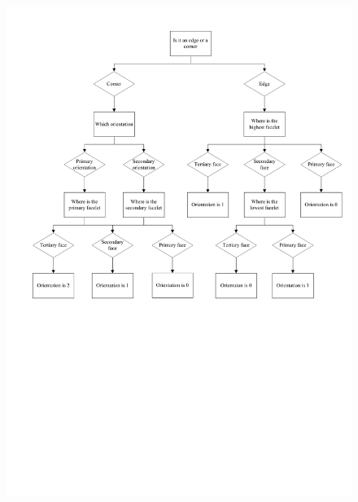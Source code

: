 \begin{figure}[hbp]
	\centering
		\includegraphics[width = \textwidth, trim = 10mm 120mm 0mm 10mm, clip]{input/pics/orientationFlow}
	\caption{}
	\label{fig:orientationFlow}
\end{figure}
